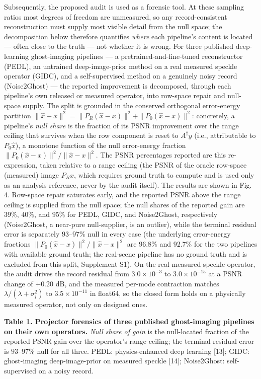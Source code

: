 \documentclass[11pt]{article}
\begin{document}
Subsequently, the proposed audit is used as a forensic tool. At these sampling ratios most degrees of freedom are unmeasured, so any record-consistent reconstruction must supply most visible detail from the null space; the decomposition below therefore quantifies \textit{where} each pipeline's content is located --- often close to the truth --- not whether it is wrong. For three published deep-learning ghost-imaging pipelines --- a pretrained-and-fine-tuned reconstructor (PEDL), an untrained deep-image-prior method on a real measured speckle operator (GIDC), and a self-supervised method on a genuinely noisy record (Noise2Ghost) --- the reported improvement is decomposed, through each pipeline's own released or measured operator, into row-space repair and null-space supply. The split is grounded in the conserved orthogonal error-energy partition $\|\hat{x}-x\|^2 = \|P_R(\hat{x}-x)\|^2 + \|P_0(\hat{x}-x)\|^2$: concretely, a pipeline's \textit{null share} is the fraction of its PSNR improvement over the range ceiling that survives when the row component is reset to $A^{\dagger}y$ (i.e., attributable to $P_0\hat{x}$), a monotone function of the null error-energy fraction $\|P_0(\hat{x}-x)\|^2/\|\hat{x}-x\|^2$. The PSNR percentages reported are this re-expression, taken relative to a range ceiling (the PSNR of the oracle row-space (measured) image $P_R x$, which requires ground truth to compute and is used only as an analysis reference, never by the audit itself). The results are shown in Fig. 4. Row-space repair saturates early, and the reported PSNR above the range ceiling is supplied from the null space; the null shares of the reported gain are $39\%$, $40\%$, and $95\%$ for PEDL, GIDC, and Noise2Ghost, respectively (Noise2Ghost, a near-pure null-supplier, is an outlier), while the terminal residual error is separately $93$--$97\%$ null in every case (the underlying error-energy fractions $\|P_0(\hat{x}-x)\|^2/\|\hat{x}-x\|^2$ are $96.8\%$ and $92.7\%$ for the two pipelines with available ground truth; the real-scene pipeline has no ground truth and is excluded from this split, Supplement S1). On the real measured speckle operator, the audit drives the record residual from $3.0\times10^{-3}$ to $3.0\times10^{-15}$ at a PSNR change of $+0.20$ dB, and the measured per-mode contraction matches $\lambda/(\lambda+\sigma_i^2)$ to $3.5\times10^{-11}$ in float64, so the closed form holds on a physically measured operator, not only on designed ones.

\textbf{Table 1. Projector forensics of three published ghost-imaging pipelines on their own operators.} \textit{Null share of gain} is the null-located fraction of the reported PSNR gain over the operator's range ceiling; the terminal residual error is $93$--$97\%$ null for all three. PEDL: physics-enhanced deep learning [13]; GIDC: ghost-imaging deep-image-prior on measured speckle [14]; Noise2Ghost: self-supervised on a noisy record.
\end{document}
